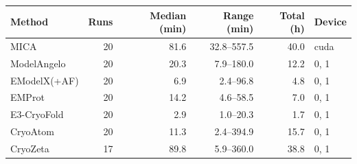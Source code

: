 \begin{tabular}{lrrrrl}
\toprule
Method & Runs & Median (min) & Range (min) & Total (h) & Device \\
\midrule
MICA & 20 & 81.6 & 32.8--557.5 & 40.0 & cuda \\
ModelAngelo & 20 & 20.3 & 7.9--180.0 & 12.2 & 0, 1 \\
EModelX(+AF) & 20 & 6.9 & 2.4--96.8 & 4.8 & 0, 1 \\
EMProt & 20 & 14.2 & 4.6--58.5 & 7.0 & 0, 1 \\
E3-CryoFold & 20 & 2.9 & 1.0--20.3 & 1.7 & 0, 1 \\
CryoAtom & 20 & 11.3 & 2.4--394.9 & 15.7 & 0, 1 \\
CryoZeta & 17 & 89.8 & 5.9--360.0 & 38.8 & 0, 1 \\
\bottomrule
\end{tabular}
